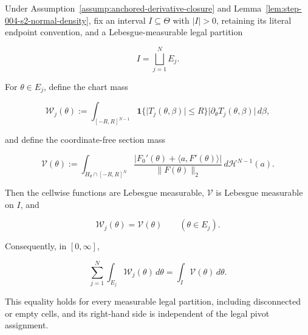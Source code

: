 \begin{lemma}
\label{lem:step-004-s2-measurable-partition}

Under Assumption~\ref{assump:anchored-derivative-closure} and
Lemma~\ref{lem:step-004-s2-normal-density}, fix an interval \(I\subseteq\Theta\) with
\(\lvert I\rvert>0\), retaining its literal endpoint convention, and a Lebesgue-measurable legal partition

\begin{equation}
\label{eq:appendix-display-130}
I=\bigsqcup_{j=1}^N E_j.
\end{equation}

For \(\theta\in E_j\), define the chart mass

\begin{equation}
\label{eq:appendix-display-131}
\mathcal W_j(\theta)
:=\int_{[-R,R]^{N-1}}
\mathbf1\{\lvert T_j(\theta,\beta)\rvert\leq R\}
\lvert\partial_\theta T_j(\theta,\beta)\rvert\,d\beta,
\end{equation}

and define the coordinate-free section mass

\begin{equation}
\label{eq:appendix-display-132}
\mathcal V(\theta)
:=\int_{H_\theta\cap[-R,R]^N}
\frac{\lvert F_0'(\theta)+\langle a,F'(\theta)\rangle\rvert}
{\lVert F(\theta)\rVert_2}
\,d\mathcal H^{N-1}(a).
\end{equation}

Then the cellwise functions are Lebesgue measurable, \(\mathcal V\) is Lebesgue measurable on \(I\), and

\begin{equation}
\label{eq:appendix-display-133}
\mathcal W_j(\theta)=\mathcal V(\theta)
\qquad(\theta\in E_j).
\end{equation}

Consequently, in \([0,\infty]\),

\begin{equation}
\label{eq:appendix-display-134}
\sum_{j=1}^N\int_{E_j}\mathcal W_j(\theta)\,d\theta
=\int_I\mathcal V(\theta)\,d\theta.
\end{equation}

This equality holds for every measurable legal partition, including disconnected or empty cells, and its
right-hand side is independent of the legal pivot assignment.


\end{lemma}

